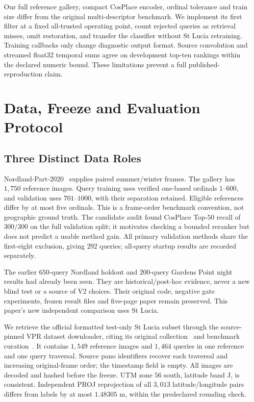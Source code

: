 \documentclass[conference]{IEEEtran}
\begin{document}
Our full reference gallery, compact CosPlace encoder, ordinal tolerance and train size differ from the original multi-descriptor benchmark. We implement its first filter at a fixed all-trusted operating point, count rejected queries as retrieval misses, omit restoration, and transfer the classifier without St Lucia retraining. Training callbacks only change diagnostic output format. Source convolution and streamed float32 temporal sums agree on development top-ten rankings within the declared numeric bound. These limitations prevent a full published-reproduction claim.

\section{Data, Freeze and Evaluation Protocol}
\subsection{Three Distinct Data Roles}
Nordland-Part-2020~\cite{nordland} supplies paired summer/winter frames. The gallery has $1,750$ reference images. Query training uses verified one-based ordinals $1$--$600$, and validation uses $701$--$1000$, with their separation retained. Eligible references differ by at most five ordinals. This is a frame-order benchmark convention, not geographic ground truth. The candidate audit found CosPlace Top-$50$ recall of $300/300$ on the full validation split; it motivates checking a bounded reranker but does not predict a usable method gain. All primary validation methods share the first-eight exclusion, giving $292$ queries; all-query startup results are recorded separately.

The earlier $650$-query Nordland holdout and $200$-query Gardens Point night results had already been seen. They are historical/post-hoc evidence, never a new blind test or a source of V2 choices. Their original code, negative gate experiments, frozen result files and five-page paper remain preserved. This paper's new independent comparison uses St Lucia.

We retrieve the official formatted test-only St Lucia subset through the source-pinned VPR dataset downloader, citing its original collection~\cite{stlucia} and benchmark curation~\cite{benchmark}. It contains $1,549$ reference images and $1,464$ queries in one reference and one query traversal. Source pano identifiers recover each traversal and increasing original-frame order; the timestamp field is empty. All images are decoded and hashed before the freeze. UTM zone $56$ south, latitude band J, is consistent. Independent PROJ reprojection of all $3,013$ latitude/longitude pairs differs from labels by at most $1.48305$ m, within the predeclared rounding check.
\end{document}
